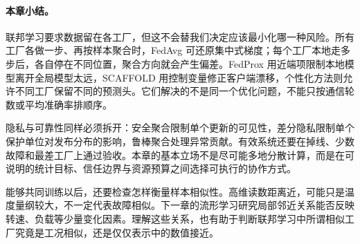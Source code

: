 \paragraph{本章小结。}
联邦学习要求数据留在各工厂，但这不会替我们决定应该最小化哪一种风险。所有工厂各做一步、再按样本聚合时，FedAvg 可还原集中式梯度；每个工厂本地走多步后，各自停在不同位置，聚合方向就会产生偏差。FedProx 用近端项限制本地模型离开全局模型太远，SCAFFOLD 用控制变量修正客户端漂移，个性化方法则允许不同工厂保留不同的预测头。它们解决的不是同一个优化问题，不能只按通信轮数或平均准确率排顺序。

隐私与可靠性同样必须拆开：安全聚合限制单个更新的可见性，差分隐私限制单个保护单位对发布分布的影响，鲁棒聚合处理异常贡献。有效系统还要在掉线、少数故障和最差工厂上通过验收。本章的基本立场不是尽可能多地分散计算，而是在可说明的统计目标、信任边界与资源预算之间选择可执行的协作方式。

能够共同训练以后，还要检查怎样衡量样本相似性。高维读数距离近，可能只是温度量纲较大，不一定代表故障相似。下一章的流形学习研究局部邻近关系能否反映转速、负载等少量变化因素。理解这些关系，也有助于判断联邦学习中所谓相似工厂究竟是工况相似，还是仅仅表示中的数值接近。
